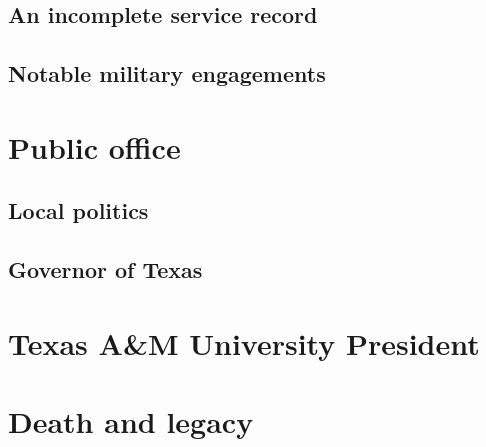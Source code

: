 \documentclass[12pt]{article}
\begin{document}
\subsection{An incomplete service record}

\subsection{Notable military engagements}

\newpage
\section{Public office}

\subsection{Local politics}

\subsection{Governor of Texas}

\newpage
\section{Texas A\&M University President}

\newpage
\section{Death and legacy}

\newpage
\printbibliography

\end{document}
